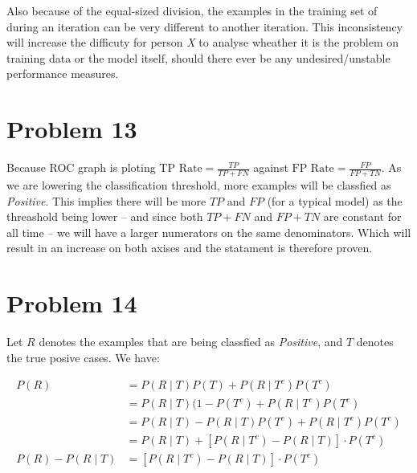 \documentclass[12pt]{article}
\begin{document}
Also because of the equal-sized division, the examples in the training set of during an iteration can be very different to another iteration. This inconsistency will increase the difficuty for person \textit{X} to analyse wheather it is the problem on training data or the model itself, should there ever be any undesired/unstable performance measures.

\section{Problem 13}

Because ROC graph is ploting $\text{TP Rate} = \frac{TP}{TP + FN}$ against $\text{FP Rate} = \frac{FP}{FP + TN}$. As we are lowering the classification threshold, more examples will be classfied as \textit{Positive}. This implies there will be more $TP$ and $FP$ (for a typical model) as the threashold being lower -- and since both $TP + FN$ and $FP + TN$ are constant for all time -- we will have a larger numerators on the same denominators. Which will result in an increase on both axises and the statament is therefore proven.

\section{Problem 14}

Let $R$ denotes the examples that are being classfied as \textit{Positive}, and $T$ denotes the true posive cases. We have:

\begin{align*}
    P(R) &= P(R \mid T)P(T) + P(R \mid T^c) P(T^c) \\
    &= P(R \mid T)(1 - P(T^c) + P(R \mid T^c) P(T^c) \\
    &= P(R \mid T) - P(R \mid T)P(T^c)+ P(R \mid T^c) P(T^c) \\
    &= P(R \mid T) + [P(R \mid T^c) -  P(R \mid T)] \cdot P(T^c) \\
    P(R) - P(R \mid T) &= [P(R \mid T^c) -  P(R \mid T)] \cdot P(T^c)
\end{align*}
\end{document}
